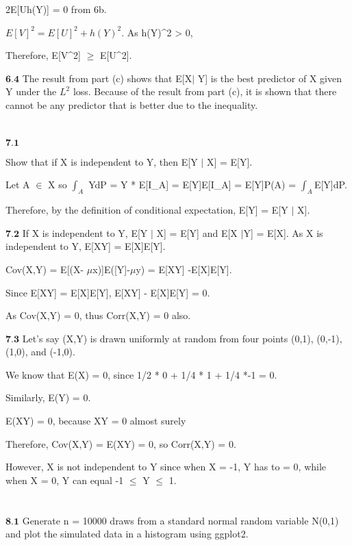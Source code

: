 2E[Uh(Y)] = 0 from 6b.

$E[V]^2 = E[U]^2 + h(Y)^2.$ As h(Y)^2 > 0, 

Therefore, E[V^2] $\geq$ E[U^2].

$\textbf{6.4}$ The result from part (c) shows that E[X$\mid$ Y] is the best predictor of X given Y under the $L^2$ loss. Because of the result from part (c), it is shown that there cannot be any predictor that is better due to the inequality.

\newpage
\section{}

$\textbf{7.1}$

Show that if X is independent to Y, then E[Y $\mid$ X] = E[Y].

Let A $\in$ X so $\int_{A}$ YdP = Y * E[I_{A}] = E[Y]E[I_{A}] = E[Y]P(A) = $\int_{A}$E[Y]dP. 

Therefore, by the definition of conditional expectation, E[Y] = E[Y $\mid$ X].

$\textbf{7.2}$ If X is independent to Y, E[Y $\mid$ X] = E[Y] and E[X $\mid $Y] = E[X]. 
As X is independent to Y, E[XY] = E[X]E[Y]. 

Cov(X,Y) = E[(X- $\mu$x)]E([Y]-$\mu$y) = E[XY] -E[X]E[Y].

Since E[XY] = E[X]E[Y], E[XY] - E[X]E[Y] = 0.

As Cov(X,Y) = 0, thus Corr(X,Y) = 0 also.

$\textbf{7.3}$ Let's say (X,Y) is drawn uniformly at random from four points (0,1), (0,-1), (1,0), and (-1,0).

We know that E(X) = 0, since 1/2 * 0 + 1/4 * 1 + 1/4 *-1 = 0.

Similarly, E(Y) = 0.

E(XY) = 0, because XY = 0 almost surely

Therefore, Cov(X,Y) = E(XY) = 0, so Corr(X,Y) = 0.

However, X is not independent to Y since when X = -1, Y has to = 0, while when X = 0, Y can equal -1 $\leq$ Y $\leq$ 1.

\newpage
\section{}

$\textbf{8.1}$ Generate n = 10000 draws from a standard normal random variable N(0,1) and plot the simulated data in a histogram using ggplot2.

